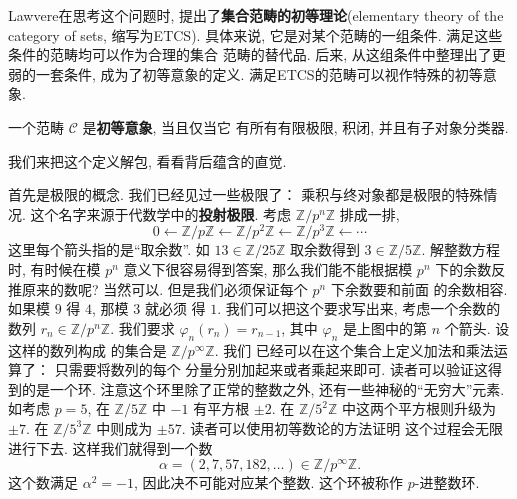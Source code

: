 Lawvere在思考这个问题时, 提出了\textbf{集合范畴的初等理论}(elementary
theory of the category of sets, 缩写为ETCS). 具体来说,
它是对某个范畴的一组条件. 满足这些条件的范畴均可以作为合理的集合
范畴的替代品. 后来, 从这组条件中整理出了更弱的一套条件,
成为了初等意象的定义. 满足ETCS的范畴可以视作特殊的初等意象.
\begin{definition}
一个范畴 \(\mathcal C\) 是\textbf{初等意象}, 当且仅当它
有所有有限极限, 积闭, 并且有子对象分类器.
\end{definition}
我们来把这个定义解包, 看看背后蕴含的直觉.

首先是极限的概念.
我们已经见过一些极限了： 乘积与终对象都是极限的特殊情况.
这个名字来源于代数学中的\textbf{投射极限}. 考虑
\(\mathbb Z/p^n\mathbb Z\) 排成一排,
\[0 \longleftarrow \mathbb Z/p\mathbb Z
\longleftarrow \mathbb Z/p^2\mathbb Z
\longleftarrow \mathbb Z/p^3\mathbb Z
\longleftarrow \cdots\]
这里每个箭头指的是“取余数”. 如
\(13 \in \mathbb Z/25\mathbb Z\)
取余数得到 \(3 \in \mathbb Z/5 \mathbb Z\).
解整数方程时, 有时候在模 \(p^n\) 意义下很容易得到答案,
那么我们能不能根据模 \(p^n\) 下的余数反推原来的数呢?
当然可以. 但是我们必须保证每个 \(p^n\) 下余数要和前面
的余数相容. 如果模 \(9\) 得 \(4\), 那模 \(3\) 就必须
得 \(1\). 我们可以把这个要求写出来, 考虑一个余数的数列
\(r_n \in \mathbb Z/p^n\mathbb Z\).
我们要求 \(\varphi_n(r_n) = r_{n-1}\), 其中
\(\varphi_n\) 是上图中的第 \(n\) 个箭头. 设这样的数列构成
的集合是 \(\mathbb Z/p^{\infty}\mathbb Z\). 我们
已经可以在这个集合上定义加法和乘法运算了： 只需要将数列的每个
分量分别加起来或者乘起来即可. 读者可以验证这得到的是一个环.
注意这个环里除了正常的整数之外, 还有一些神秘的“无穷大”元素.
如考虑 \(p = 5\), 在 \(\mathbb Z/5\mathbb Z\) 中
\(-1\) 有平方根 \(\pm2\). 在 \(\mathbb Z/5^2\mathbb Z\)
中这两个平方根则升级为 \(\pm7\). 在 \(\mathbb Z/5^3\mathbb Z\)
中则成为 \(\pm57\). 读者可以使用初等数论的方法证明
这个过程会无限进行下去. 这样我们就得到一个数
\[\alpha = (2,7,57,182,\dots) \in \mathbb Z/p^{\infty}\mathbb Z.\]
这个数满足 \(\alpha^2 = -1\), 因此决不可能对应某个整数.
这个环被称作 \(p\)-进整数环.

